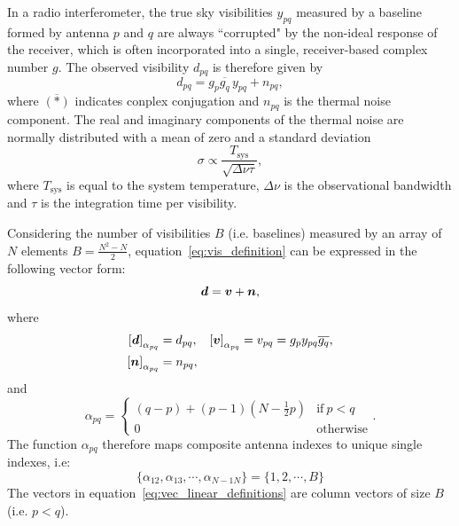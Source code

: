 \documentclass[useAMS,usenatbib]{mn2e}
\newcommand{\bd}{\bmath{d}}
\newcommand{\bv}{\bmath{v}}
\newcommand{\bn}{\bmath{n}}
\newcommand{\conj}[1]{\overline{#1}}
\begin{document}
In a radio interferometer, the true sky visibilities $y_{pq}$ measured by a baseline formed by antenna $p$ and $q$ are always ``corrupted" by the non-ideal response of the receiver, which is often incorporated into a single, receiver-based complex number $g$. The observed visibility $d_{pq}$ is therefore given by \citep{ME1,ME2,RRIME1}
\begin{equation}
\label{eq:vis_definition}
d_{pq} = g_{p}\conj{g_q} \, y_{pq} + n_{pq},
\end{equation}
where $\conj{(*)}$ indicates conplex conjugation and $n_{pq}$ is the thermal noise component. 
The real and imaginary components of the thermal noise are normally distributed with a mean of zero and a
standard deviation
\begin{equation}
\sigma \propto \frac{T_{\textrm{sys}}}{\sqrt{\Delta \nu \tau}},
\end{equation}
where $T_{\textrm{sys}}$ is equal to the system temperature, $\Delta \nu$ is the observational bandwidth and $\tau$ is the integration time per visibility.

Considering the number of visibilities $B$ (i.e. baselines) measured by an array of $N$ elements $B = \frac{N^2-N}{2}$, equation~\ref{eq:vis_definition} can be expressed in the following vector form:
\begin{equation}
\label{eq:vis_linear_definition}
\bd = \bv + \bn, 
\end{equation}
where 
\begin{align}
 \left [ \bd \right]_{\alpha_{pq}} &= d_{pq}, & \left [ \bv \right ]_{\alpha_{pq}} &= v_{pq}=g_p y_{pq} \conj{g_q},\nonumber\\
 \left [ \bn \right ]_{\alpha_{pq}} &= n_{pq}, &  &\label{eq:vec_linear_definitions}
\end{align}
and 
\begin{equation}
\alpha_{pq} =
\begin{cases}
(q-p) + (p-1)\left (N-\frac{1}{2}p \right ) & \textrm{if}~p<q\\
0 & \textrm{otherwise}
\end{cases}.
\end{equation}
The function $\alpha_{pq}$ therefore maps composite antenna indexes to unique single indexes, i.e:
\begin{equation}
\{\alpha_{12},\alpha_{13},\cdots,\alpha_{N-1N}\} = \{1,2,\cdots,B\} 
\end{equation}
The vectors in equation~\ref{eq:vec_linear_definitions} are column vectors of size $B$ (i.e. $p<q$).
\end{document}
